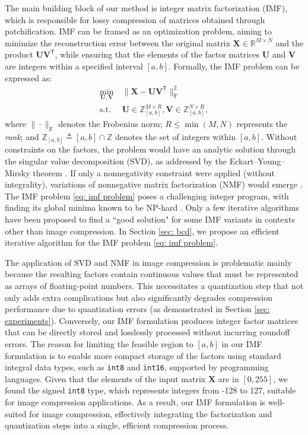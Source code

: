 The main building block of our method is integer matrix factorization (IMF), which is responsible for lossy compression of matrices obtained through patchification. IMF can be framed as an optimization problem, aiming to minimize the reconstruction error between the original matrix $\bm{X} \in \mathbb{R}^{M \times N}$ and the product $\bm{U} \bm{V}^\mathsf{T}$, while ensuring that the elements of the factor matrices $\bm{U}$ and $\bm{V}$ are integers within a specified interval $[a,b]$. Formally, the IMF problem can be expressed as:
\begin{align} \label{eq: imf problem}
	\min_{\bm{U}, \bm{V}} & \ \| \bm{X} - \bm{U} \bm{V}^\mathsf{T} \|_\text{F}^2 \nonumber \\
	\text{s.t.}           & \ \bm{U} \in \mathbb{Z}_{[a,b]}^{M \times R}, \bm{V} \in \mathbb{Z}_{[a,b]}^{N \times R},
\end{align}
where $\|\cdot\|_\text{F}$ denotes the Frobenius norm; $R \leq \min(M,N)$ represents the \emph{rank}; and $\mathbb{Z}_{[a,b]} \triangleq [a, b] \cap \mathbb{Z}$ denotes the set of integers within $[a,b]$. Without constraints on the factors, the problem would have an analytic solution through the singular value decomposition (SVD), as addressed by the Eckart–Young–Mirsky theorem \cite{eckart1936approximation}. If only a nonnegativity constraint were applied (without integrality), variations of nonnegative matrix factorization (NMF) would emerge \cite{lee2000algorithms, gillis2020nonnegative}. The IMF problem \eqref{eq: imf problem} poses a challenging integer program, with finding its global minima known to be NP-hard \cite{dong2018integer, van1981another}. Only a few iterative algorithms \cite{dong2018integer, lin2005integer} have been proposed to find a ``good solution" for some IMF variants in contexts other than image compression. In Section \ref{sec: bcd}, we propose an efficient iterative algorithm for the IMF problem \eqref{eq: imf problem}.

The application of SVD and NMF in image compression is problematic mainly because the resulting factors contain continuous values that must be represented as arrays of floating-point numbers. This necessitates a quantization step that not only adds extra complications but also significantly degrades compression performance due to quantization errors (as demonstrated in Section \ref{sec: experiments}). Conversely, our IMF formulation produces integer factor matrices that can be directly stored and losslessly processed without incurring roundoff errors. The reason for limiting the feasible region to $[a,b]$ in our IMF formulation is to enable more compact storage of the factors using standard integral data types, such as \texttt{int8} and \texttt{int16}, supported by programming languages. Given that the elements of the input matrix $\bm{X}$ are in $[0, 255]$, we found the signed \texttt{int8} type, which represents integers from -128 to 127, suitable for image compression applications. As a result, our IMF formulation is well-suited for image compression, effectively integrating the factorization and quantization steps into a single, efficient compression process.


